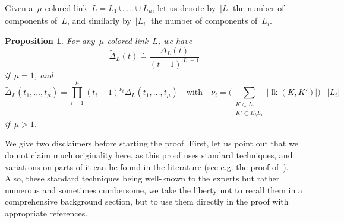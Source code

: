 \documentclass{amsart}
\DeclareMathOperator{\lk}{lk}
\newtheorem{prop}[thm]{Proposition}
\theoremstyle{definition}
\theoremstyle{remark}
\begin{document}
	Given a~$\mu$-colored link~$L=L_1\cup\dots\cup L_\mu$, let us denote by~$\vert L\vert$ the number of components of~$L$, and similarly by~$\vert L_i\vert$ the number of components of~$L_i$.
	
	\begin{prop}
	\label{prop:Hosokawa}
	For any~$\mu$-colored link~$L$, we have
	\[
	\widetilde\Delta_L(t)\stackrel{\cdot}{=}\frac{\Delta_L(t)}{(t-1)^{|L|-1}}
	\]
	if~$\mu=1$, and
	\[
	\widetilde\Delta_L(t_1,\dots,t_\mu)\stackrel{\cdot}{=}
	\prod_{i=1}^\mu (t_i-1)^{\nu_i}\Delta_L(t_1,\dots,t_\mu)\quad\text{with}\quad \nu_i=\Big(\sum_{\substack{K\subset L_i\\ K'\subset L\setminus L_i}}\vert\lk(K,K')\vert\Big)-\vert L_i\vert
	\]
	if~$\mu>1$.
	\end{prop}
	
	We give two disclaimers before starting the proof.
	First, let us point out that we do not claim much originality here, as this proof uses standard techniques, and variations
	on parts of it can be found in the literature (see e.g. the proof of~\cite[Lemma~3.3]{BFP16}).
	Also, these standard techniques being well-known to the experts but rather numerous and sometimes cumbersome, we take the liberty not to
	recall them in a comprehensive background section, but to use them directly in the proof with appropriate references.
	
\end{document}
